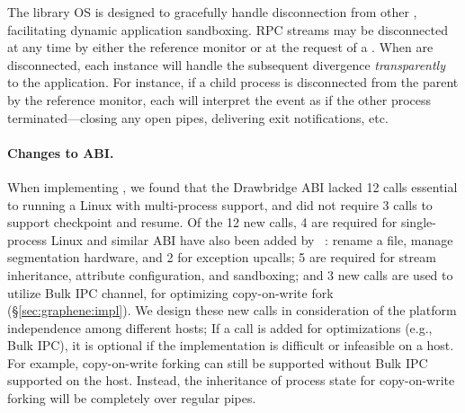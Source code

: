 The \sysname{} library OS is designed
to gracefully handle disconnection from other \liboses{}, 
facilitating dynamic application sandboxing.
RPC streams may be disconnected at any time by 
either the reference monitor or at the request of a \libos{}.
When \sysname{} \liboses{} are disconnected, each instance will handle the subsequent
divergence 
{\em transparently} to the application.
For instance, if a child process is disconnected from the parent by the reference monitor,
each \libos{} will interpret the event as if the other process terminated---closing any open pipes,
delivering exit notifications, etc.



\paragraph{Changes to \pal{} ABI.}
When implementing \sysname{},
we found that the Drawbridge ABI lacked 12 \pal{} calls
essential to running a Linux \libos{} with multi-process support, and 
\sysname{} did not require 3 \pal{} calls to support checkpoint and resume.
Of the 12 new calls, 4 are required for single-process Linux and similar ABI have also been added by ~\citep{baumann13bascule}:
rename a file, manage segmentation hardware, and 2 for exception upcalls;
5 are required for stream inheritance, attribute configuration, and sandboxing;
and 3 new calls are used to utilize Bulk IPC channel, for optimizing copy-on-write fork (\S\ref{sec:graphene:impl}).
We design these new \pal{} calls in consideration of the platform independence
among different hosts;
If a \pal{} call is added for optimizations (e.g., Bulk IPC),
it is optional if the implementation is difficult or infeasible on a host.
For example, copy-on-write forking can still be supported
without Bulk IPC supported on the host.
Instead, the inheritance of process state for
copy-on-write forking will be completely over regular pipes.

